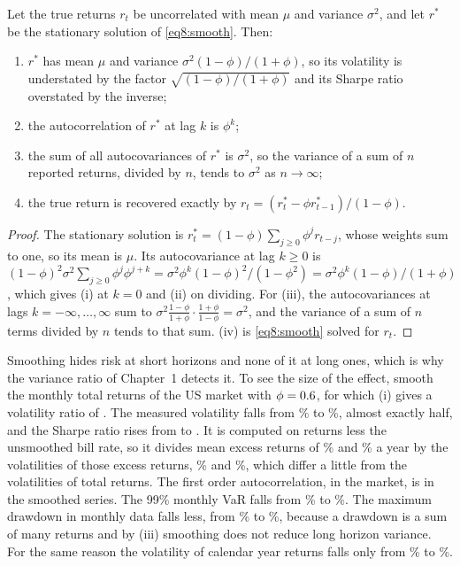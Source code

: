 \begin{chapterrefs}
\begin{proposition}\label{prop8:smooth}
Let the true returns $r_t$ be uncorrelated with mean $\mu$ and variance $\sigma^2$, and let $r^*$ be the
stationary solution of \cref{eq8:smooth}. Then:
\begin{enumerate}[label=(\roman*)]
  \item $r^*$ has mean $\mu$ and variance $\sigma^2(1-\phi)/(1+\phi)$, so its volatility is understated
  by the factor $\sqrt{(1-\phi)/(1+\phi)}$ and its Sharpe ratio overstated by the inverse;
  \item the autocorrelation of $r^*$ at lag $k$ is $\phi^k$;
  \item the sum of all autocovariances of $r^*$ is $\sigma^2$, so the variance of a sum of $n$ reported
  returns, divided by $n$, tends to $\sigma^2$ as $n\to\infty$;
  \item the true return is recovered exactly by $r_t=(r^*_t-\phi r^*_{t-1})/(1-\phi)$.
\end{enumerate}
\end{proposition}
\begin{proof}
The stationary solution is $r^*_t=(1-\phi)\sum_{j\ge0}\phi^j r_{t-j}$, whose weights sum to one, so its
mean is $\mu$. Its autocovariance at lag $k\ge0$ is
$(1-\phi)^2\sigma^2\sum_{j\ge0}\phi^j\phi^{j+k}=\sigma^2\phi^k(1-\phi)^2/(1-\phi^2)=\sigma^2\phi^k(1-\phi)/(1+\phi)$,
which gives (i) at $k=0$ and (ii) on dividing. For (iii), the autocovariances at lags
$k=-\infty,\dots,\infty$ sum to $\sigma^2\frac{1-\phi}{1+\phi}\cdot\frac{1+\phi}{1-\phi}=\sigma^2$, and the
variance of a sum of $n$ terms divided by $n$ tends to that sum. (iv) is \cref{eq8:smooth} solved for
$r_t$.
\end{proof}

Smoothing hides risk at short horizons and none of it at long ones, which is why the variance ratio
of Chapter~1 detects it. To see the size of the effect, smooth the monthly total returns of the US
market with $\phi=0.6$, for which (i) gives a volatility ratio of \smVolRatioTheory. The measured
volatility falls from \smVolT\% to \smVolS\%, almost exactly half, and the Sharpe ratio rises from \smSRT{} to \smSRS. It is computed on returns less
the unsmoothed bill rate, so it divides mean excess returns of \smExMeanT\% and \smExMeanS\% a year by
the volatilities of those excess returns, \smExVolT\% and \smExVolS\%, which differ a little from the
volatilities of total returns. The first order autocorrelation, \smAcT{} in the market, is \smAcS{} in the
smoothed series. The 99\% monthly VaR falls from \smVarT\% to \smVarS\%. The maximum drawdown in
monthly data falls less, from \smMddT\% to \smMddS\%, because a drawdown is a sum of many returns and
by (iii) smoothing does not reduce long horizon variance. For the same reason the volatility of
calendar year returns falls only from \smAnnVolT\% to \smAnnVolS\%.


\end{chapterrefs}
